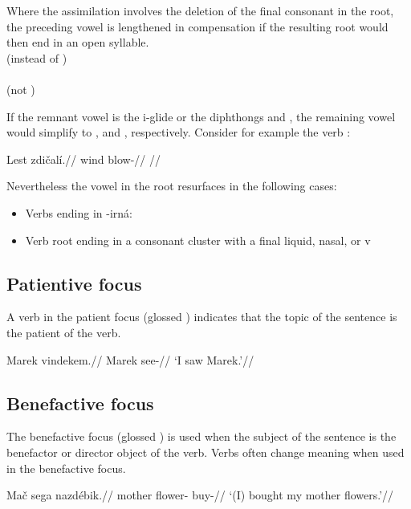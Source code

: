 Where the assimilation involves the deletion of the final consonant in the root, the preceding vowel is lengthened in compensation if the resulting root would then end in an open syllable.
\pex
{}\\
(instead of )\\
\xe
\pex
{}\\
(not )\\
\xe

If the remnant vowel is the i-glide  or the diphthongs  and , the remaining vowel would simplify to ,  and , respectively. Consider for example the verb  :

\pex
\begingl
\gla Lest zdi\v{c}al\'i.//
\glb wind blow-//
\glft {}//
\endgl
\xe

Nevertheless the vowel  in the root resurfaces in the following cases:

\begin{itemize}
	\item Verbs ending in -irn\'a:
	\item Verb root ending in a consonant cluster with a final liquid, nasal, or v
\end{itemize}

\subsection{Patientive focus}
\par A verb in the patient focus (glossed ) indicates that the topic of the sentence is the patient of the verb.

\pex
\begingl
\gla Marek vindekem.//
\glb Marek see-//
\glft `I saw Marek.'//
\endgl
\xe


\subsection{Benefactive focus}
\par The benefactive focus (glossed ) is used when the subject of the sentence is the benefactor or director object of the verb. Verbs often change meaning when used in the benefactive focus.

\pex
\begingl
\gla Ma\v{c} sega nazd\'ebik.//
\glb mother flower- buy-//
\glft `(I) bought my mother flowers.'//
\endgl
\xe

